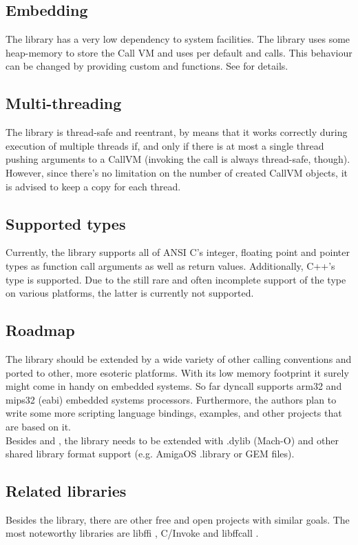 \subsection{Embedding}

The  library has a very low dependency to system facilities.
The library uses some heap-memory to store the Call VM and uses per default
 and  calls. This behaviour can be changed by 
providing custom  and  functions.
See  for details.


\subsection{Multi-threading}

The  library is thread-safe and reentrant, by means that it
works correctly during execution of multiple threads if, and only if there is
at most a single thread pushing arguments to a CallVM (invoking the call is
always thread-safe, though). However, since there's no limitation on the
number of created CallVM objects, it is advised to keep a copy for each
thread.


\subsection{Supported types}

Currently, the  library supports all of ANSI C's integer,
floating point and pointer types as function call arguments as well as return
values. Additionally, C++'s  type is supported. Due to the still
rare and often incomplete support of the  type on various
platforms, the latter is currently not supported.


\subsection{Roadmap}

The  library should be extended by a wide variety of other
calling conventions and ported to other, more esoteric platforms. With its low
memory footprint it surely might come in handy on embedded systems. So far
dyncall supports arm32 and mips32 (eabi) embedded systems processors.
Furthermore, the authors plan to write some more scripting language bindings,
examples, and other projects that are based on it.\\
Besides  and , the 
library needs to be extended with .dylib (Mach-O) and other shared library format
support (e.g. AmigaOS .library or GEM \cite{.ldg} files).


\subsection{Related libraries}

Besides the  library, there are other free and open projects
with similar goals. The most noteworthy libraries are libffi \cite{libffi},
C/Invoke \cite{cinvoke} and libffcall \cite{libffcall}.
